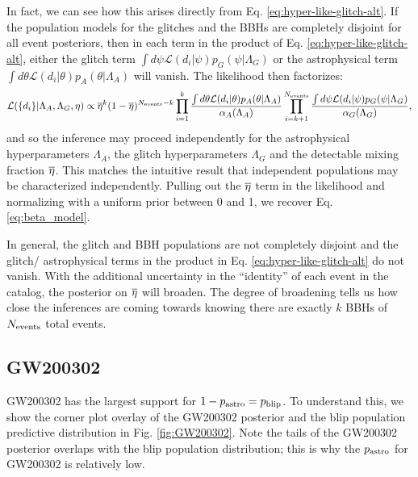 \begin{refsection}
In fact, we can see how this arises directly from Eq. \ref{eq:hyper-like-glitch-alt}. If the population models for the glitches and the BBHs are completely disjoint for all event posteriors, then in each term in the product of Eq. \ref{eq:hyper-like-glitch-alt}, either the glitch term $\int d\psi \mathcal{L}(d_i|\psi)p_G(\psi|\Lambda_G)$ or the astrophysical term $\int d\theta \mathcal{L}(d_i|\theta)p_A(\theta|\Lambda_A)$ will vanish. The likelihood then factorizes:
\begin{align}
\mathcal{L}(\{d_i\} | \Lambda_A, \Lambda_G, \eta) \propto  \overline{\eta}^k (1-\overline{\eta})^{N_{\rm events} - k}\prod_{i=1}^k \frac{\int d\theta \mathcal{L}(d_i|\theta)p_A(\theta|\Lambda_A)}{\alpha_A(\Lambda_A)}\prod_{i=k+1}^{N_{\rm events}}\frac{\int d\psi \mathcal{L}(d_i|\psi)p_G(\psi|\Lambda_G)}{\alpha_G(\Lambda_G)},
\label{eq:hyper-like-glitch-separate}    
\end{align}
and so the inference may proceed independently for the astrophysical hyperparameters $\Lambda_A$, the glitch hyperparameters $\Lambda_G$ and the detectable mixing fraction $\overline{\eta}$. This matches the intuitive result that independent populations may be characterized independently. Pulling out the $\overline{\eta}$ term in the likelihood and normalizing with a uniform prior between 0 and 1, we recover Eq. \ref{eq:beta_model}.

In general, the glitch and BBH populations are not completely disjoint and the glitch/ astrophysical terms in the product in Eq. \ref{eq:hyper-like-glitch-alt} do not vanish. With the additional uncertainty in the ``identity'' of each event in the catalog, the posterior on $\overline{\eta}$ will broaden. The degree of broadening tells us how close the inferences are coming towards knowing there are exactly $k$ BBHs of $N_{\rm events}$ total events.


\subsection*{GW200302}

GW200302 has the largest support for $1 - p_{\rm astro} = p_{\rm blip}$. To understand this, we show the corner plot overlay of the GW200302 posterior and the blip population predictive distribution in Fig. \ref{fig:GW200302}. Note the tails of the GW200302 posterior overlaps with the blip population distribution; this is why the $p_{\rm astro}$ for GW200302 is relatively low.


\end{refsection}
